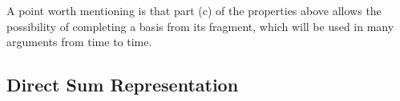 A point worth mentioning is that part (c) of the properties above allows the possibility of completing a basis from its fragment, which will be used in many arguments from time to time.

\subsection{Direct Sum Representation}

